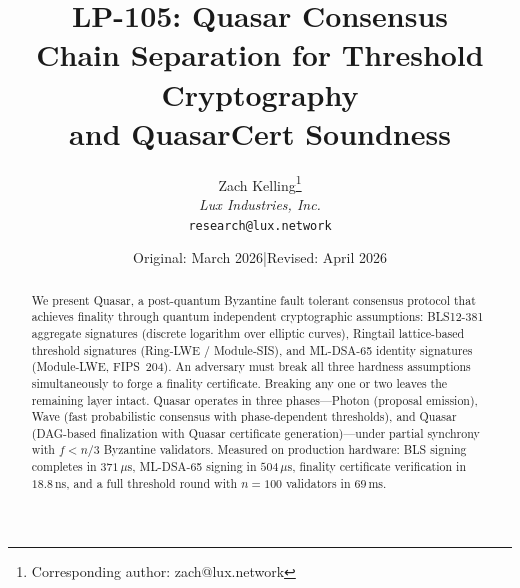 \documentclass[11pt,a4paper]{article}
\title{LP-105: Quasar Consensus\\[4pt]
\large Chain Separation for Threshold Cryptography\\
and QuasarCert Soundness}
\author{
Zach Kelling\thanks{Corresponding author: zach@lux.network}\\
\textit{Lux Industries, Inc.}\\
\texttt{research@lux.network}
}
\date{Original: March 2026\quad|\quad Revised: April 2026}
\begin{document}
\luxcoverpage

\begin{abstract}
We present Quasar, a post-quantum Byzantine fault tolerant consensus protocol
that achieves finality through quantum independent cryptographic assumptions:
BLS12-381 aggregate signatures (discrete logarithm over elliptic curves),
Ringtail lattice-based threshold signatures (Ring-LWE / Module-SIS), and
ML-DSA-65 identity signatures (Module-LWE, FIPS~204). An adversary must break
all three hardness assumptions simultaneously to forge a finality certificate.
Breaking any one or two leaves the remaining layer intact. Quasar operates in
three phases---Photon (proposal emission), Wave (fast probabilistic consensus
with phase-dependent thresholds), and Quasar (DAG-based finalization with
Quasar certificate generation)---under partial synchrony with $f < n/3$
Byzantine validators. Measured on production hardware: BLS signing completes
in $371\,\mu\text{s}$, ML-DSA-65 signing in $504\,\mu\text{s}$, finality
certificate verification in $18.8\,\text{ns}$, and a full threshold round
with $n=100$ validators in $69\,\text{ms}$.
\end{abstract}

\tableofcontents
\newpage















\end{document}
